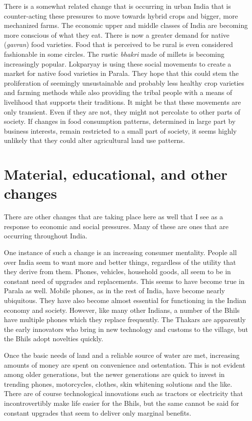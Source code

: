 \documentclass[report.tex]{subfiles}
\begin{document}
There is a somewhat related change that is occurring in urban India that is counter-acting these pressures to move towards hybrid crops and bigger, more mechanized farms. The economic upper and middle classes of India are becoming more conscious of what they eat. There is now a greater demand for native (\textit{gavran}) food varieties. Food that is perceived to be rural is even considered fashionable in some circles. The rustic \textit{bhakri} made of millets is becoming increasingly popular. Lokparyay is using these social movements to create a market for native food varieties in Parala. They hope that this could stem the proliferation of seemingly unsustainable and probably less healthy crop varieties and farming methods while also providing the tribal people with a means of livelihood that supports their traditions. It might be that these movements are only transient. Even if they are not, they might not percolate to other parts of society. If changes in food consumption patterns, determined in large part by business interests, remain restricted to a small part of society, it seems highly unlikely that they could alter agricultural land use patterns.

\newpage

\section{Material, educational, and other changes}\label{sec:otherchanges}

There are other changes that are taking place here as well that I see as a response to economic and social pressures. Many of these are ones that are occurring throughout India.

One instance of such a change is an increasing consumer mentality. People all over India seem to want more and better things, regardless of the utility that they derive from them. Phones, vehicles, household goods, all seem to be in constant need of upgrades and replacements. This seems to have become true in Parala as well. Mobile phones, as in the rest of India, have become nearly ubiquitous. They have also become almost essential for functioning in the Indian economy and society. However, like many other Indians, a number of the Bhils have multiple phones which they replace frequently. The Thakars are apparently the early innovators who bring in new technology and customs to the village, but the Bhils adopt novelties quickly.

Once the basic needs of land and a reliable source of water are met, increasing amounts of money are spent on convenience and ostentation. This is not evident among older generations, but the newer generations are quick to invest in trending phones, motorcycles, clothes, skin whitening solutions and the like. There are of course technological innovations such as tractors or electricity that incontrovertibly make life easier for the Bhils, but the same cannot be said for constant upgrades that seem to deliver only marginal benefits.
\end{document}

